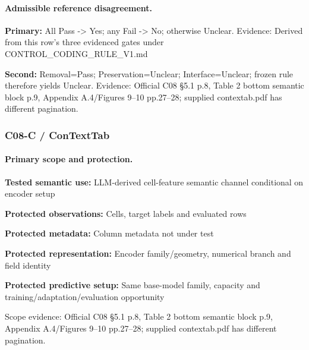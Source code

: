 \documentclass[10pt]{article}
\begin{document}
\paragraph{Admissible reference disagreement.}
\textbf{Primary:} All Pass -> Yes; any Fail -> No; otherwise Unclear. Evidence: Derived from this row’s three evidenced gates under CONTROL\_CODING\_RULE\_V1.md\par
\textbf{Second:} Removal=Pass; Preservation=Unclear; Interface=Unclear; frozen rule therefore yields Unclear. Evidence: Official C08 §5.1 p.8, Table 2 bottom semantic block p.9, Appendix A.4/Figures 9--10 pp.27--28; supplied contextab.pdf has different pagination.\par
\subsubsection*{C08-C / ConTextTab}
\paragraph{Primary scope and protection.}
\textbf{Tested semantic use:} LLM-derived cell-feature semantic channel conditional on encoder setup\par
\textbf{Protected observations:} Cells, target labels and evaluated rows\par
\textbf{Protected metadata:} Column metadata not under test\par
\textbf{Protected representation:} Encoder family/geometry, numerical branch and field identity\par
\textbf{Protected predictive setup:} Same base-model family, capacity and training/adaptation/evaluation opportunity\par
Scope evidence: Official C08 §5.1 p.8, Table 2 bottom semantic block p.9, Appendix A.4/Figures 9--10 pp.27--28; supplied contextab.pdf has different pagination.\par
\end{document}
